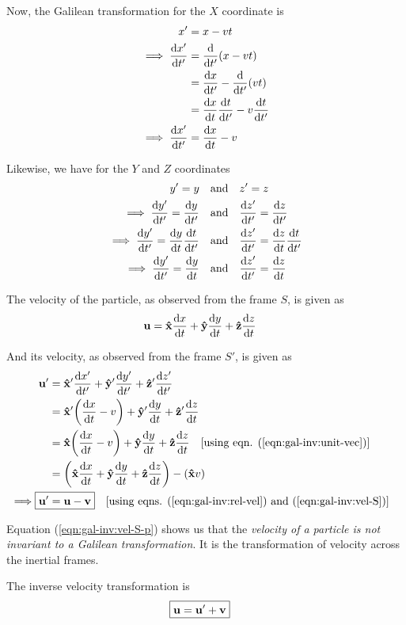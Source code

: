 			Now, the Galilean transformation for the $X$ coordinate is
			\begin{align*}
				x'&=x-vt \\
				\implies\dv{x'}{t'}&=\dv{t'}\qty(x-vt) \\
					&=\dv{x}{t'}-\dv{t'}\qty(vt) \\
					&=\dv{x}{t}\dv{t}{t'}-v\dv{t}{t'} \\
				\implies\dv{x'}{t'}&=\dv{x}{t}-v
			\end{align*}
			
			Likewise, we have for the $Y$ and $Z$ coordinates
			\begin{align*}
				y'=y&\qq{and}z'=z \\
				\implies\dv{y'}{t'}=\dv{y}{t'}&\qq{and}\dv{z'}{t'}=\dv{z}{t'} \\
				\implies\dv{y'}{t'}=\dv{y}{t}\dv{t}{t'}&\qq{and}\dv{z'}{t'}=\dv{z}{t}\dv{t}{t'} \\
				\implies\dv{y'}{t'}=\dv{y}{t}&\qq{and}\dv{z'}{t'}=\dv{z}{t}
			\end{align*}
			
			The velocity of the particle, as observed from the frame $S$, is given as
			\begin{align}
				\vb{u}&=\vu{x}\dv{x}{t}+\vu{y}\dv{y}{t}+\vu{z}\dv{z}{t} \label{eqn:gal-inv:vel-S}
			\end{align}
			
			And its velocity, as observed from the frame $S'$, is given as
			\begin{align}
				\vb{u}'&=\vu{x}'\dv{x'}{t'}+\vu{y}'\dv{y'}{t'}+\vu{z}'\dv{z'}{t'} \nonumber\\
					&=\vu{x}'\qty(\dv{x}{t}-v)+\vu{y}'\dv{y}{t}+\vu{z}'\dv{z}{t} \nonumber\\
					&=\vu{x}\qty(\dv{x}{t}-v)+\vu{y}\dv{y}{t}+\vu{z}\dv{z}{t}\qq{[using eqn. (\ref{eqn:gal-inv:unit-vec})]} \nonumber\\
					&=\qty(\vu{x}\dv{x}{t}+\vu{y}\dv{y}{t}+\vu{z}\dv{z}{t})-\qty(\vu{x}v) \nonumber\\
				\implies\Aboxed{\vb{u}'&=\vb{u}-\vb{v}}\qq{[using eqns. (\ref{eqn:gal-inv:rel-vel}) and (\ref{eqn:gal-inv:vel-S})]} \label{eqn:gal-inv:vel-S-p}
			\end{align}
			
			Equation (\ref{eqn:gal-inv:vel-S-p}) shows us that the \emph{velocity of a particle is not invariant to a Galilean transformation}. It is the transformation of velocity across the inertial frames.
			
			The inverse velocity transformation is
			\begin{align}
				\Aboxed{\vb{u}&=\vb{u}'+\vb{v}} \label{eqn:gal-inv:vel-S-p-inv}
			\end{align}
			
